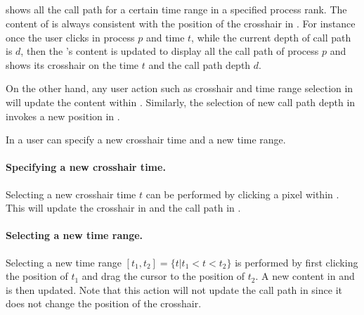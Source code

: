 \subsection{\depthview}
\label{sec:depthview}

\depthview{} shows all the call path for a certain time range in a specified process rank. The content of \depthview{} is always consistent with the position of the crosshair in \traceview{}.
For instance once the user clicks in process $p$ and time $t$, while the current depth of call path is $d$, then the \depthview's content is updated to display all the call path of process $p$ and shows its crosshair on the time $t$ and the call path depth $d$.

On the other hand, any user action such as crosshair and time range selection in \depthview{} will update the content within \traceview. Similarly, the selection of new call path depth in \callview{} invokes a new position in \depthview.

In \depthview{} a user can specify a new crosshair time and a new time range.
\paragraph{Specifying a new crosshair time.} Selecting a new crosshair time $t$ can be performed by clicking a pixel within \depthview{}. This will update the crosshair in \traceview{} and the call path in \callview.

\paragraph{Selecting a new time range.} Selecting a new time range $[t_1,t_2]= \{t|t_1<t<t_2\}$ is performed by first clicking the position of $t_1$ and drag the cursor to the position of $t_2$. A new content in \depthview{} and \traceview{} is then updated. Note that this action will not update the call path in \callview{} since it does not change the position of the crosshair.


\subsection{\callview}
\label{sec:callview}

